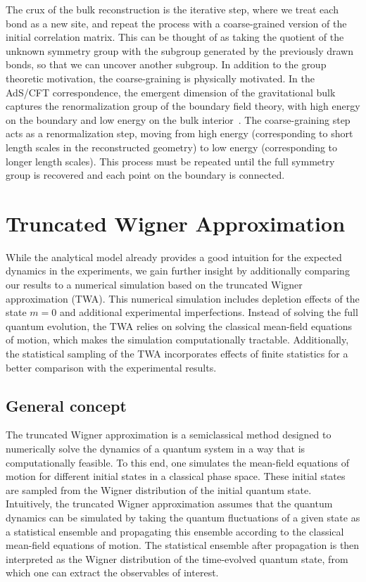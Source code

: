 \begin{bibunit}
The crux of the bulk reconstruction is the iterative step, where we treat each bond as a new site, and repeat the process with a coarse-grained version of the initial correlation matrix.  This can be thought of as taking the quotient of the unknown symmetry group with the subgroup generated by the previously drawn bonds, so that we can uncover another subgroup.  In addition to the group theoretic motivation, the coarse-graining is physically motivated.  In the AdS/CFT correspondence, the emergent dimension of the gravitational bulk captures the renormalization group of the boundary field theory, with high energy on the boundary and low energy on the bulk interior~\cite{hartnoll2018holographic,qi2018does}.  The coarse-graining step acts as a renormalization step, moving from high energy  (corresponding to short length scales in the reconstructed geometry) to low energy (corresponding to longer length scales).  This process must be repeated until the full symmetry group is recovered and each point on the boundary is connected.

\section{Truncated Wigner Approximation}
While the analytical model already provides a good intuition for the expected dynamics in the experiments, we gain further insight by additionally comparing our results to a numerical simulation based on the truncated Wigner approximation (TWA).  This numerical simulation includes depletion effects of the state $m=0$ and additional experimental imperfections.  Instead of solving the full quantum evolution, the TWA relies on solving the classical mean-field equations of motion, which makes the simulation computationally tractable. Additionally, the statistical sampling of the TWA incorporates effects of finite statistics for a better comparison with the experimental results.

\subsection{General concept}

The truncated Wigner approximation is a semiclassical method designed to numerically solve the dynamics of a quantum system in a way that is computationally feasible. To this end, one simulates the mean-field equations of motion for different initial states in a classical phase space. These initial states are sampled from the Wigner distribution of the initial quantum state. Intuitively, the truncated Wigner approximation assumes that the quantum dynamics can be simulated by taking the quantum fluctuations of a given state as a statistical ensemble and propagating this ensemble according to the classical mean-field equations of motion. The statistical ensemble after propagation is then interpreted as the Wigner distribution of the time-evolved quantum state, from which one can extract the observables of interest.


\end{bibunit}

